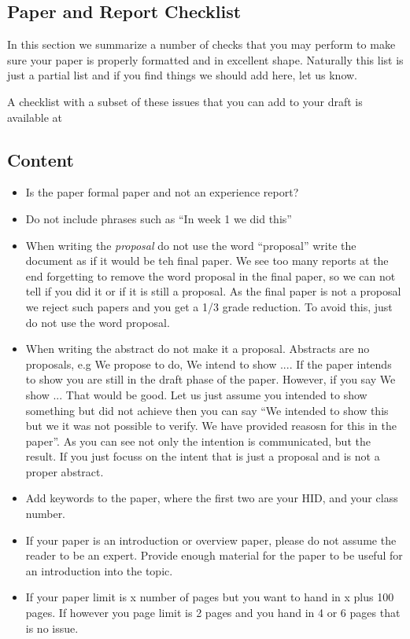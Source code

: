 \subsection{Paper and Report Checklist}\label{paper-checklist}

In this section we summarize a number of checks that you may perform to
make sure your paper is properly formatted and in excellent shape.
Naturally this list is just a partial list and if you find things we
should add here, let us know.

A checklist with a subset of these issues that you can add to your draft is available at


\subsection{Content}

\begin{itemize}[label=$\Box$]
    \item Is the paper formal paper and not an experience report? 
    \item Do not include phrases such as ``In week 1 we did this''
    \item When writing the \textit{proposal} do not use the word ``proposal''
      write the document as if it would be teh final paper. We see too
      many reports at the end forgetting to remove the word proposal
      in the final paper, so we can not tell if you did it or if it is
      still a proposal. As the final paper is not a proposal we reject
      such papers and you get a 1/3 grade reduction. To avoid this,
      just do not use the word proposal.
    \item When writing the abstract do not make it a
      proposal. Abstracts are no proposals, e.g We propose to do, We
      intend to show .... If the paper intends to show you are still
      in the draft phase of the paper. However, if you say We show
      ... That would be good. Let us just assume you intended to show
      something but did not achieve then you can say ``We intended to
      show this but we it was not possible to verify. We have provided
      reasosn for this in the paper''. As you can see not only the
      intention is communicated, but the result. If you just focuss on
      the intent that is just a proposal and is not a proper abstract.
    \item Add keywords to the paper, where the first two are your HID,
      and your class number.
    \item If your paper is an introduction or overview paper, please
      do not assume the reader to be an expert. Provide enough
      material for the paper to be useful for an introduction into the
      topic.
    \item If your paper limit is x number of pages but you want to
      hand in x plus 100 pages. If however you page limit is 2 pages
      and you hand in 4 or 6 pages that is no issue.
\end{itemize}

